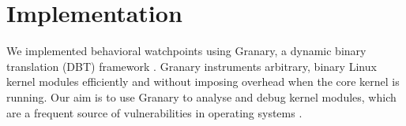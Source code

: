 \documentclass[letterpaper,twocolumn,10pt]{article}
\begin{document}



\section{Implementation}
We implemented behavioral watchpoints using Granary, a dynamic binary translation (DBT) framework \cite{GranaryAtOSDI}. Granary instruments arbitrary, binary Linux kernel modules efficiently and without imposing overhead when the core kernel is running. Our aim is to use Granary to analyse and debug kernel modules, which are a frequent source of vulnerabilities in operating systems \cite{BGI,LXFI}.
\end{document}
